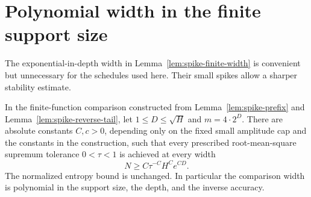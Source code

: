 \section{Polynomial width in the finite support size}
\label{sec:canonical-polynomial-width}
The exponential-in-depth width in Lemma~\ref{lem:spike-finite-width} is convenient but unnecessary for the schedules used here. Their small spikes allow a sharper stability estimate.

\begin{theorem}
\label{thm:canonical-polynomial-width}
In the finite-function comparison constructed from Lemma~\ref{lem:spike-prefix} and Lemma~\ref{lem:spike-reverse-tail}, let $1\le D\le\sqrt H$ and $m=4\cdot2^D$. There are absolute constants $C,c>0$, depending only on the fixed small amplitude cap and the constants in the construction, such that every prescribed root-mean-square supremum tolerance $0<\tau<1$ is achieved at every width
\[
 N\ge C\tau^{-C}H^C e^{CD}.
\]
The normalized entropy bound is unchanged. In particular the comparison width is polynomial in the support size, the depth, and the inverse accuracy.
\end{theorem}
